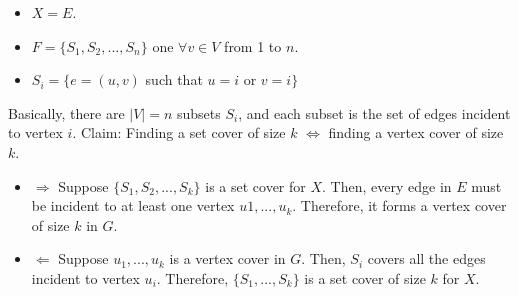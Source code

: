 \begin{itemize}
    \item $X = E$.
    \item $F = \{S_1, S_2, ..., S_n\}$ one $\forall v \in V$ from 1 to $n$.
    \item $S_i = \{e = (u, v)$ such that $u=i$ or $v=i\}$
\end{itemize}
Basically, there are $|V| = n$ subsets $S_i$, and each subset is the set of edges incident to vertex $i$.\newline\newline
Claim: Finding a set cover of size $k$ $\iff$ finding a vertex cover of size $k$.
\begin{itemize}
    \item $\Rightarrow$ Suppose $\{S_1, S_2, ..., S_k\}$ is a set cover for $X$. Then, every edge in $E$ must be incident to at least one vertex $u1, ..., u_k$. Therefore, it forms a vertex cover of size $k$ in $G$.

    \item  $\Leftarrow$ Suppose $u_1, ..., u_k$ is a vertex cover in $G$. Then, $S_i$ covers all the edges incident to vertex $u_i$. Therefore, $\{S_1, ..., S_k\}$ is a set cover of size $k$ for $X$.
\end{itemize}

